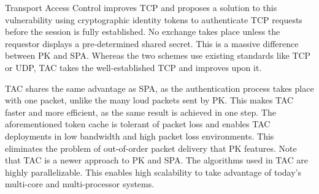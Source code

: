 Transport Access Control improves TCP and proposes a solution to this vulnerability using cryptographic identity tokens to authenticate TCP requests before the session is fully established.  No exchange takes place unless the requestor displays a pre-determined shared secret.  This is a massive difference between PK and SPA. Whereas the two schemes use existing standards like TCP or UDP, TAC takes the well-established TCP and improves upon it. \\\par 

TAC shares the same advantage as SPA, as the authentication process takes place with one packet, unlike the many loud packets sent by PK. This makes TAC faster and more efficient, as the same result is achieved in one step. The aforementioned token cache is tolerant of packet loss and enables TAC deployments in low bandwidth and high packet loss environments. This eliminates the problem of out-of-order packet delivery that PK features. Note that TAC is a newer approach to PK and SPA. The algorithms used in TAC are highly parallelizable. This enables high scalability to take advantage of today's multi-core and multi-processor systems.\\\par

